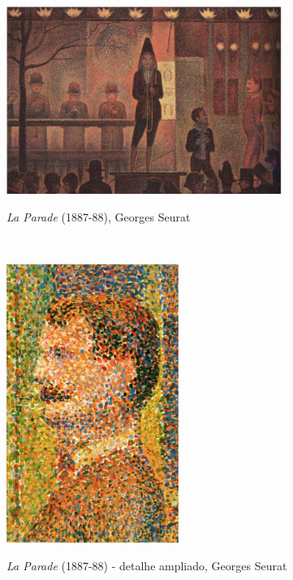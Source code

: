 \begin{figure}[H]
    \centering
    \caption{\textit{La Parade} (1887-88), Georges Seurat}
	\vspace*{0,2cm}
    \includegraphics[width=0.8\textwidth]{./04-figuras/seurat_la_parede}
    \label{fig:seurat_la_parede}
\end{figure}
\vspace*{-0,9cm}
{\raggedright {}}\\
   
\begin{figure}[H]
    \centering
    \caption{\textit{La Parade} (1887-88) - detalhe ampliado, Georges Seurat}
	\vspace*{0,2cm}
    \includegraphics[width=0.5\textwidth]{./04-figuras/seurat_la_parede_detalhe}
    \label{fig:seurat_la_parede_detalhe}
\end{figure}
\vspace*{-0,9cm}
{\raggedright {}}\\

